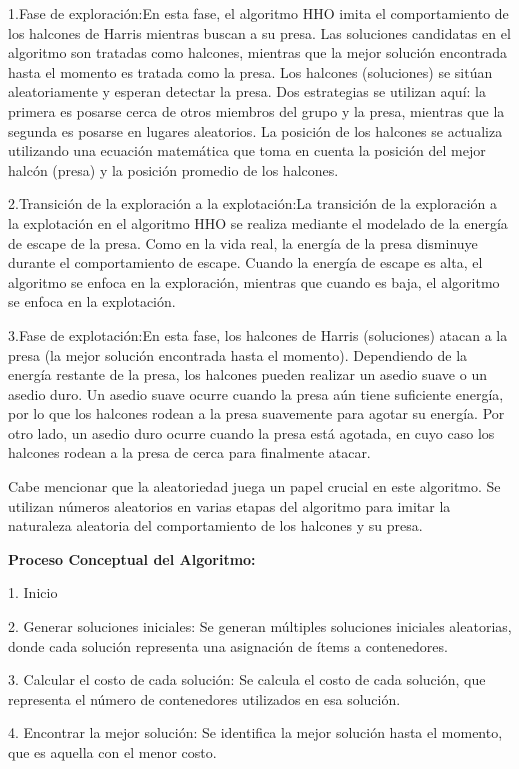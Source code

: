 \documentclass[final,5p,times,twocolumn]{elsarticle}
\begin{document}
1.Fase de exploración:En esta fase, el algoritmo HHO imita el comportamiento de los halcones de Harris mientras buscan a su presa. Las soluciones candidatas en el algoritmo son tratadas como halcones, mientras que la mejor solución encontrada hasta el momento es tratada como la presa. Los halcones (soluciones) se sitúan aleatoriamente y esperan detectar la presa. Dos estrategias se utilizan aquí: la primera es posarse cerca de otros miembros del grupo y la presa, mientras que la segunda es posarse en lugares aleatorios. La posición de los halcones se actualiza utilizando una ecuación matemática que toma en cuenta la posición del mejor halcón (presa) y la posición promedio de los halcones.

2.Transición de la exploración a la explotación:La transición de la exploración a la explotación en el algoritmo HHO se realiza mediante el modelado de la energía de escape de la presa. Como en la vida real, la energía de la presa disminuye durante el comportamiento de escape. Cuando la energía de escape es alta, el algoritmo se enfoca en la exploración, mientras que cuando es baja, el algoritmo se enfoca en la explotación.

3.Fase de explotación:En esta fase, los halcones de Harris (soluciones) atacan a la presa (la mejor solución encontrada hasta el momento). Dependiendo de la energía restante de la presa, los halcones pueden realizar un asedio suave o un asedio duro. Un asedio suave ocurre cuando la presa aún tiene suficiente energía, por lo que los halcones rodean a la presa suavemente para agotar su energía. Por otro lado, un asedio duro ocurre cuando la presa está agotada, en cuyo caso los halcones rodean a la presa de cerca para finalmente atacar.

Cabe mencionar que la aleatoriedad juega un papel crucial en este algoritmo. Se utilizan números aleatorios en varias etapas del algoritmo para imitar la naturaleza aleatoria del comportamiento de los halcones y su presa.

\textbf{Proceso Conceptual del Algoritmo:}

1. Inicio

2. Generar soluciones iniciales: Se generan múltiples soluciones iniciales aleatorias, donde cada solución representa una asignación de ítems a contenedores.

3. Calcular el costo de cada solución: Se calcula el costo de cada solución, que representa el número de contenedores utilizados en esa solución.

4. Encontrar la mejor solución: Se identifica la mejor solución hasta el momento, que es aquella con el menor costo.
\end{document}
